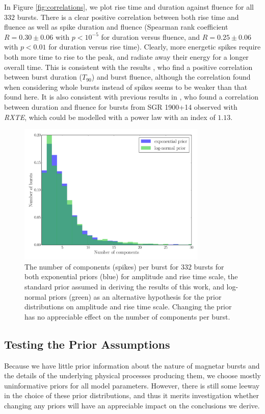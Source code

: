 \documentclass[12pt]{emulateapj}
\newcommand{\project}[1]{\textsl{#1}}
\newcommand{\rxte}{\project{RXTE}}
\begin{document}
In Figure \ref{fig:correlations}, we plot rise time and duration against fluence for all $332$ bursts. There is a clear positive
correlation between both rise time and fluence as well as spike duration and fluence (Spearman rank coefficient $R = 0.30\pm0.06$ with $p < 10^{-5}$ for duration versus fluence,
and $R = 0.25\pm0.06$ with $p < 0.01$ for duration versus rise time). Clearly, more energetic spikes require both more time to rise to the peak,
and radiate away their energy for a longer overall time. This is consistent with the results \citet{vanderhorst2012}, who find a positive correlation between burst duration ($T_{90}$)
and burst fluence, although the correlation found when considering whole bursts instead of spikes seems to be weaker than that found here. It is also consistent with 
previous results in \citet{gogus1999}, who found a correlation between
duration and fluence for bursts from SGR 1900+14 observed with \rxte, which could be modelled with a power law with an index of $1.13$. 
  \begin{figure}[htbp]
\begin{center}
\includegraphics[width=9cm]{sgr1550_prior_nspikes.pdf}
\caption{The number of  components (spikes) per burst for $332$ bursts for both exponential priors (blue) for amplitude and rise time scale, the standard prior assumed in
deriving the results of this work, and log-normal priors (green) as an alternative hypothesis for the prior distributions on amplitude and rise time scale. Changing the prior has 
no appreciable effect on the number of components per burst.}
\label{fig:nspikes_prior}
\end{center}
\end{figure}
\subsection{Testing the Prior Assumptions}
\label{sec:priortest}
Because we have little prior information about the nature of magnetar bursts and the details of
the underlying physical processes producing them, we choose mostly uninformative priors for all model parameters. However,
there is still some leeway in the choice of these prior distributions, and thus it merits investigation whether changing
any priors will have an appreciable impact on the conclusions we derive. 
\end{document}
